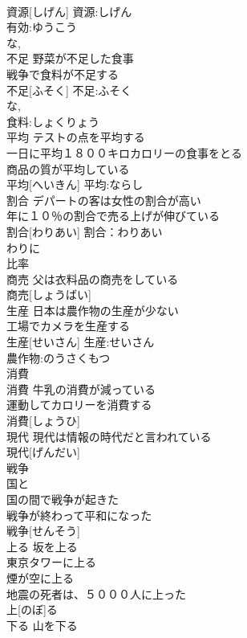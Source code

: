 \documentclass[8pt]{extreport}
\begin{document}
\begin{CJK}{UTF8}{min}
\\	資源[しげん]			資源:しげん
\\	有効:ゆうこう
\\	な, 
\\	不足	野菜が不足した食事 
\\	戦争で食料が不足する 
\\	不足[ふそく]			不足:ふそく
\\	な, 
\\	食料:しょくりょう
\\	平均	テストの点を平均する 
\\	一日に平均１８００キロカロリーの食事をとる 
\\	商品の質が平均している 
\\	平均[へいきん]			平均:ならし
\\	割合	デパートの客は女性の割合が高い 
\\	年に１０％の割合で売る上げが伸びている 
\\	割合[わりあい]			割合：わりあい
\\	わりに 
\\	比率 
\\	商売	父は衣料品の商売をしている 
\\	商売[しょうばい]						
\\	生産	日本は農作物の生産が少ない 
\\	工場でカメラを生産する 
\\	生産[せいさん]			生産:せいさん
\\	農作物:のうさくもつ
\\	消費 
\\	消費	牛乳の消費が減っている 
\\	運動してカロリーを消費する 
\\	消費[しょうひ]						
\\	現代	現代は情報の時代だと言われている 
\\	現代[げんだい]						
\\	戦争	
\\	国と 
\\	国の間で戦争が起きた 
\\	戦争が終わって平和になった 
\\	戦争[せんそう]						
\\	上る	坂を上る 
\\	東京タワーに上る 
\\	煙が空に上る 
\\	地震の死者は、５０００人に上った 
\\	上[のぼ]る						
\\	下る	山を下る 

\end{CJK}
\end{document}
